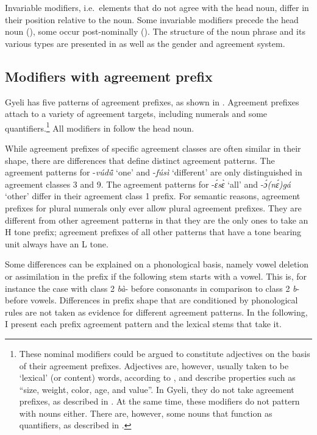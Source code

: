 Invariable modifiers, i.e.\ elements that do not agree with the head noun, differ in their position relative to the noun. Some invariable modifiers precede the head noun (), some occur post-nominally (). The structure of the noun phrase and its various types are presented in  as well as the gender and agreement system.






\subsection{Modifiers with agreement prefix}
\label{sec:MODAgrPre}


Gyeli has five patterns of agreement prefixes, as shown in . Agreement prefixes attach to a variety of agreement targets, including numerals and some quantifiers.\footnote{These nominal modifiers could be argued to constitute adjectives on the basis of their agreement prefixes. Adjectives are, however, usually taken to be `lexical' (or content) words, according to \citet[121]{rijkhoff2002}, and describe properties such as ``size, weight, color, age, and value''. In Gyeli, they do not take agreement prefixes, as described in . At the same time, these modifiers do not pattern with nouns either. There are, however, some nouns that function as quantifiers, as described in .} All modifiers in  follow the head noun.


While agreement prefixes of specific agreement classes are often similar in their shape, there are differences that define distinct agreement patterns. The agreement patterns for -{\itshape vúdũ̂} `one' and -{\itshape fúsì} `different' are only distinguished in agreement classes 3 and 9. The agreement patterns for -{\itshape ɛ́sɛ̀} `all' and -{\itshape ɔ́(nɛ́)gá} `other' differ in their agreement class 1 prefix. For semantic reasons, agreement prefixes for plural numerals only ever allow plural agreement prefixes. They are different from other agreement patterns in that they are the only ones to take an H tone prefix; agreement prefixes of all other patterns that have a tone bearing unit always have an L tone.

Some differences can be explained on a phonological basis, namely vowel deletion or assimilation in the prefix if the following stem starts with a vowel. This is, for instance the case with class 2 {\itshape bà}- before consonants in comparison to class 2 {\itshape b}- before vowels. Differences in prefix shape that are conditioned by phonological rules are not taken as evidence for different agreement patterns. In the following, I present each prefix agreement pattern and the lexical stems that take it.



